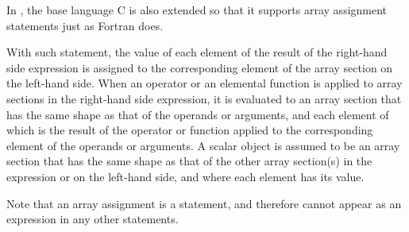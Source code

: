 
In {\XMPC}, the base language C is also extended so that it supports
array assignment statements just as Fortran does.

With such statement, the value of each element of the result of the
right-hand side expression is assigned to the corresponding element of
the array section on the left-hand side.
%
When an operator or an elemental function
is applied to array sections in the right-hand side
expression, it is evaluated to an array section that has the same shape
as that of the operands or arguments, and each element of which is the
result of the operator or function applied to the corresponding element
of the operands or arguments. A scalar object is assumed to be an array
section that has the same shape as that of the other array section(s) in
the expression or on the left-hand side, and
where each element has its value.

Note that an array assignment is a statement, and therefore cannot
appear as an expression in any other statements.



